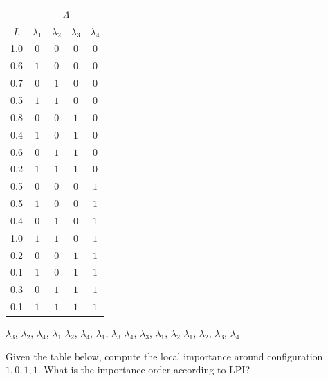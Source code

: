 \documentclass{exam}
\begin{document}
\begin{questions}
      \begin{tabular}{c|cccc}
          & \multicolumn{4}{c}{$\Lambda$} \\
          $L$ & $\lambda_1$ & $\lambda_2$ & $\lambda_3$ & $\lambda_4$ \\
          \hline
          1.0 & $0$ & $0$ & $0$ & $0$ \\
          0.6 & $1$ & $0$ & $0$ & $0$ \\
          0.7 & $0$ & $1$ & $0$ & $0$ \\
          0.5 & $1$ & $1$ & $0$ & $0$ \\
          0.8 & $0$ & $0$ & $1$ & $0$ \\
          0.4 & $1$ & $0$ & $1$ & $0$ \\
          0.6 & $0$ & $1$ & $1$ & $0$ \\
          0.2 & $1$ & $1$ & $1$ & $0$ \\
          0.5 & $0$ & $0$ & $0$ & $1$ \\
          0.5 & $1$ & $0$ & $0$ & $1$ \\
          0.4 & $0$ & $1$ & $0$ & $1$ \\
          1.0 & $1$ & $1$ & $0$ & $1$ \\
          0.2 & $0$ & $0$ & $1$ & $1$ \\
          0.1 & $1$ & $0$ & $1$ & $1$ \\
          0.3 & $0$ & $1$ & $1$ & $1$ \\
          0.1 & $1$ & $1$ & $1$ & $1$ \\
      \end{tabular}
\begin{choices}
    \choice $\lambda_3$, $\lambda_2$, $\lambda_4$, $\lambda_1$
    \choice $\lambda_2$, $\lambda_4$, $\lambda_1$, $\lambda_3$
    \choice $\lambda_4$, $\lambda_3$, $\lambda_1$, $\lambda_2$ %
    \choice $\lambda_1$, $\lambda_2$, $\lambda_3$, $\lambda_4$
\end{choices}

\question Given the table below, compute the local importance around configuration $1, 0, 1, 1$. What is the importance order according to LPI?


\end{questions}
\end{document}
